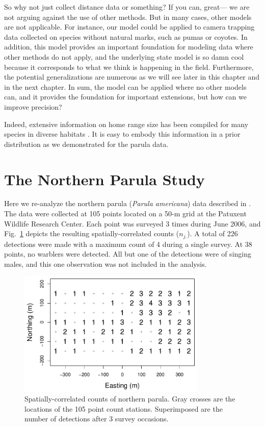 So why not just collect distance data or something? If you can, great---
we are not arguing against the use of other methods. But in many
cases, other models are not applicable. For instance, our model could
be applied to camera trapping data collected on species without
natural marks, such as pumas or coyotes. In addition, this
model provides an important foundation for modeling data where other
methods do not apply, and the underlying state model is so damn cool
because it corresponds to what we think is happening in the field.
Furthermore, the potential generalizations are numerous as we
will see later in this chapter and in the next chapter. In sum, the
model can be applied where no other models can, and it provides the
foundation for important extensions, but how can we improve precision?

Indeed, extensive information on home range size has
been compiled for many species in diverse habitats %
\citep[\emph{e.g.},][]{degraaf_yamasaki:2001}. It is
easy to embody this information in a prior distribution as we
demonstrated for the parula data.




\section{The Northern Parula Study}

Here we re-analyze the northern parula ({\it Parula americana}) data
described in \citet{chandler_royle:2012}. The data were collected at
105 points located on a 50-m grid at the Patuxent Wildlife Research
Center. Each point was surveyed 3 times during June 2006, and
Fig.~\ref{fig:nopaDat} depicts the resulting spatially-correlated
counts ($n_{j.}$). A total of 226 detections were made with a maximum
count of 4 during a single survey. At 38 points, no warblers were
detected. All but one of the detections were of singing males, and
this one observation was not included in the analysis.

\begin{figure}
  \centering
  \includegraphics[width=0.8\textwidth]{Ch18-Unmarked/figs/nopaCounts}
  \caption{Spatially-correlated counts of northern parula. Gray
    crosses are the locations of the 105 point count
    stations. Superimposed are the number of detections after 3 survey occasions.}
  \label{fig:nopaDat}
\end{figure}


